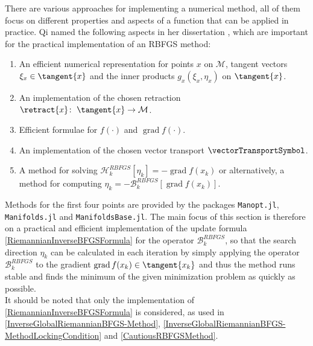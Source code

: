 There are various approaches for implementing a numerical method, all of them focus on different properties and aspects of a function that can be applied in practice. Qi named the following aspects in her dissertation \cite{Qi:2011}, which are important for the practical implementation of an RBFGS method:
\begin{enumerate}
    \item An efficient numerical representation for points $x$ on $\mathcal{M}$, tangent vectors $\xi_x \in \tangent{x}$ and the inner products $g_x(\xi_x, \eta_x)$ on $\tangent{x}$.
    \item An implementation of the chosen retraction $\retract{x} \colon \; \tangent{x} \to \mathcal{M}$.
    \item Efficient formulae for $f(\cdot)$ and $\operatorname{grad} f(\cdot)$.
    \item An implementation of the chosen vector transport $\vectorTransportSymbol$.
    \item A method for solving $\mathcal{H}^{RBFGS}_{k} [\eta_k] = -\operatorname{grad} f(x_k)$ or alternatively, a method for computing $\eta_k = -\mathcal{B}^{RBFGS}_{k} [\operatorname{grad} f(x_k)]$. 
\end{enumerate}
Methods for the first four points are provided by the packages \lstinline!Manopt.jl!, \lstinline!Manifolds.jl! and \lstinline!ManifoldsBase.jl!. The main focus of this section is therefore on a practical and efficient implementation of the update formula \cref{RiemannianInverseBFGSFormula} for the operator $\mathcal{B}^{RBFGS}_{k}$, so that the search direction $\eta_k$ can be calculated in each iteration by simply applying the operator $\mathcal{B}^{RBFGS}_{k}$ to the gradient $\operatorname{grad} f(x_k) \in \tangent{x_k}$ and thus the method runs stable and finds the minimum of the given minimization problem as quickly as possible. \\
It should be noted that only the implementation of \cref{RiemannianInverseBFGSFormula} is considered, as used in \cref{InverseGlobalRiemannianBFGS-Method}, \cref{InverseGlobalRiemannianBFGS-MethodLockingCondition} and \cref{CautiousRBFGSMethod}.


